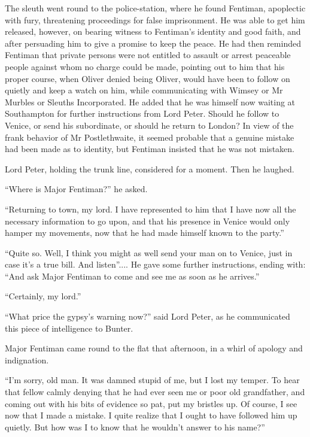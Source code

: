 The sleuth went round to the police-station, where he found Fentiman, apoplectic with fury, threatening proceedings for false imprisonment. He was able to get him released, however, on bearing witness to Fentiman's identity and good faith, and after persuading him to give a promise to keep the peace. He had then reminded Fentiman that private persons were not entitled to assault or arrest peaceable people against whom no charge could be made, pointing out to him that his proper course, when Oliver denied being Oliver, would have been to follow on quietly and keep a watch on him, while communicating with Wimsey or Mr Murbles or Sleuths Incorporated. He added that he was himself now waiting at Southampton for further instructions from Lord Peter. Should he follow to Venice, or send his subordinate, or should he return to London? In view of the frank behavior of Mr Postlethwaite, it seemed probable that a genuine mistake had been made as to identity, but Fentiman insisted that he was not mistaken.

Lord Peter, holding the trunk line, considered for a moment. Then he laughed.

\enquote{Where is Major Fentiman?} he asked.

\enquote{Returning to town, my lord. I have represented to him that I have now all the necessary information to go upon, and that his presence in Venice would only hamper my movements, now that he had made himself known to the party.}

\enquote{Quite so. Well, I think you might as well send your man on to Venice, just in case it's a true bill. And listen}.... He gave some further instructions, ending with: \enquote{And ask Major Fentiman to come and see me as soon as he arrives.}

\enquote{Certainly, my lord.}

\enquote{What price the gypsy's warning now?} said Lord Peter, as he communicated this piece of intelligence to Bunter.

Major Fentiman came round to the flat that afternoon, in a whirl of apology and indignation.

\enquote{I'm sorry, old man. It was damned stupid of me, but I lost my temper. To hear that fellow calmly denying that he had ever seen me or poor old grandfather, and coming out with his bits of evidence so pat, put my bristles up. Of course, I see now that I made a mistake. I quite realize that I ought to have followed him up quietly. But how was I to know that he wouldn't answer to his name?}

